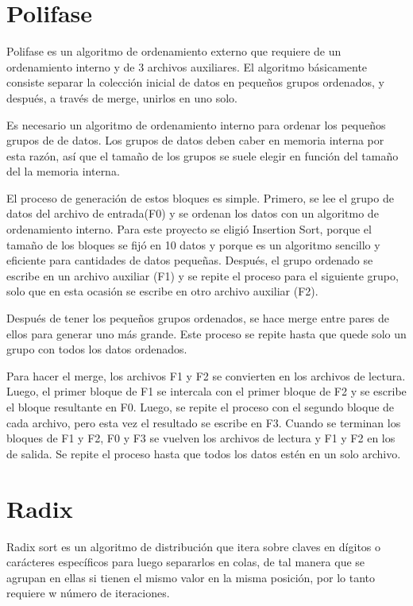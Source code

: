 \documentclass[11pt]{article}
\begin{document}
\section{Polifase}
Polifase es un algoritmo de ordenamiento externo que requiere de un ordenamiento interno y de 3 archivos auxiliares. El algoritmo básicamente consiste separar la colección inicial de datos en pequeños grupos ordenados, y después, a través de merge, unirlos en uno solo. 
\par
Es necesario un algoritmo de ordenamiento interno para ordenar los pequeños grupos de de datos. Los grupos de datos deben caber en memoria interna por esta razón, así que el tamaño de los grupos se suele elegir en función del tamaño del la memoria interna.
\par
El proceso de generación de estos bloques es simple. Primero, se lee el grupo de datos del archivo de entrada(F0) y se ordenan los datos con un algoritmo de ordenamiento interno. Para este proyecto se eligió Insertion Sort, porque el tamaño de los bloques se fijó en 10 datos y porque es un algoritmo sencillo y eficiente para cantidades de datos pequeñas. Después, el grupo ordenado se escribe en un archivo auxiliar (F1) y se repite el proceso para el siguiente grupo, solo que en esta ocasión se escribe en otro archivo auxiliar (F2).
 
\par 
Después de tener los pequeños grupos ordenados, se hace merge entre pares de ellos para generar uno más grande. Este proceso se repite hasta que quede solo un grupo con todos los datos ordenados.
\par
Para hacer el merge, los archivos F1 y F2 se convierten en los archivos de lectura. Luego, el primer bloque de F1 se intercala con el primer bloque de F2 y se escribe el bloque resultante en F0. Luego, se repite el proceso con el segundo bloque de cada archivo, pero esta vez el resultado se escribe en F3. Cuando se terminan los bloques de F1 y F2, F0 y F3 se vuelven los archivos de lectura y F1 y F2 en los de salida. Se repite el proceso hasta que todos los datos estén en un solo archivo.

\section{Radix}
Radix sort es un algoritmo de distribución que itera sobre claves en dígitos o carácteres específicos para luego separarlos en colas, de tal manera que se agrupan en ellas si tienen el mismo valor en la misma posición, por lo tanto requiere w número de iteraciones.
\end{document}
